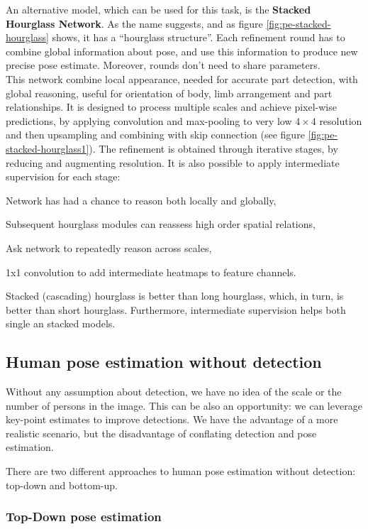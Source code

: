 An alternative model, which can be used for this task, is the \textbf{Stacked Hourglass Network}. As the name suggests, and as figure \ref{fig:pe-stacked-hourglass} shows, it has a ``hourglass structure''. Each refinement round has to combine global information about pose, and use this information to produce new precise pose estimate. Moreover, rounds don't need to share parameters.\\
This network combine local appearance, needed for accurate part detection, with global reasoning, useful for orientation of body, limb arrangement and part relationships. It is designed to process multiple scales and achieve pixel-wise predictions, by applying convolution and max-pooling to very low $4 \times 4$ resolution and then upsampling and combining with skip connection (see figure \ref{fig:pe-stacked-hourglass1}). The refinement is obtained through iterative stages, by reducing and augmenting resolution. It is also possible to apply intermediate supervision for each stage:
\begin{myitem}
    \item Network has had a chance to reason both locally and globally,
    \item Subsequent hourglass modules can reassess high order spatial relations,
    \item Ask network to repeatedly reason across scales,
    \item 1x1 convolution to add intermediate heatmaps to feature channels.
\end{myitem}
Stacked (cascading) hourglass is better than long hourglass, which, in turn, is better than short hourglass. Furthermore, intermediate supervision helps both single an stacked models.


\subsection{Human pose estimation without detection}\label{sec:pe-without-detection}

Without any assumption about detection, we have no idea of the scale or the number of persons in the image. This can be also an opportunity: we can leverage key-point estimates to improve detections. We have the advantage of a more realistic scenario, but the disadvantage of conflating detection and pose estimation.

There are two different approaches to human pose estimation without detection: top-down and bottom-up.


\subsubsection{Top-Down pose estimation}\label{sec:pe-top-down}

